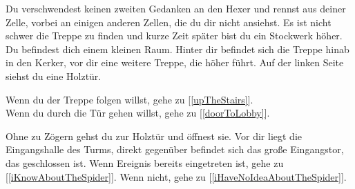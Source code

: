 
Du verschwendest keinen zweiten Gedanken an den Hexer und rennst aus deiner Zelle, vorbei an einigen anderen Zellen, die du dir nicht ansiehst. Es ist nicht schwer die Treppe zu finden und kurze Zeit später bist du ein Stockwerk höher. Du befindest dich einem kleinen Raum. Hinter dir befindet sich die Treppe hinab in den Kerker, vor dir eine weitere Treppe, die höher führt. Auf der linken Seite siehst du eine Holztür.

Wenn du der Treppe folgen willst, gehe zu [\ref{upTheStairs}].
\\Wenn du durch die Tür gehen willst, gehe zu [\ref{doorToLobby}].


Ohne zu Zögern gehst du zur Holztür und öffnest sie. Vor dir liegt die Eingangshalle des Turms, direkt gegenüber befindet sich das große Eingangstor, das geschlossen ist. Wenn Ereignis  bereits eingetreten ist, gehe zu [\ref{iKnowAboutTheSpider}].
Wenn nicht, gehe zu [\ref{iHaveNoIdeaAboutTheSpider}].
